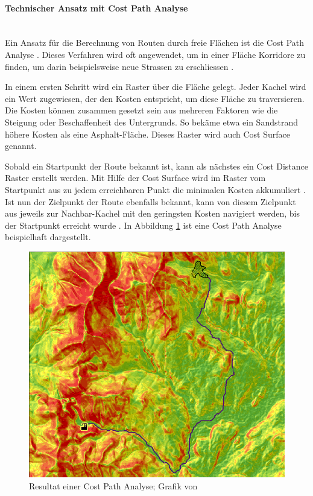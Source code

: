 \paragraph{Technischer Ansatz mit Cost Path Analyse}~\\
Ein Ansatz für die Berechnung von Routen durch freie Flächen ist die Cost Path Analyse \cite{cost_path_analysis}. Dieses Verfahren wird oft angewendet, um in einer Fläche Korridore zu finden, um darin beispielsweise neue Strassen zu erschliessen \cite{gis-wiki:cost-path-analysis}.

In einem ersten Schritt wird ein Raster über die Fläche gelegt. Jeder Kachel wird ein Wert zugewiesen, der den Kosten entspricht, um diese Fläche zu traversieren. Die Kosten können zusammen gesetzt sein aus mehreren Faktoren wie die Steigung oder Beschaffenheit des Untergrunds. So bekäme etwa ein Sandstrand höhere Kosten als eine Asphalt-Fläche. Dieses Raster wird auch Cost Surface genannt. \cite{gid_fundamentals}

Sobald ein Startpunkt der Route bekannt ist, kann als nächstes ein Cost Distance Raster erstellt werden. Mit Hilfe der Cost Surface wird im Raster vom Startpunkt aus zu jedem erreichbaren Punkt die minimalen Kosten akkumuliert \cite{geospatial_analysis}. Ist nun der Zielpunkt der Route ebenfalls bekannt, kann von diesem Zielpunkt aus jeweils zur Nachbar-Kachel mit den geringsten Kosten navigiert werden, bis der Startpunkt erreicht wurde \cite{cost_path_analysis}. In Abbildung \ref{fig:cost_path_analysis} ist eine Cost Path Analyse beispielhaft dargestellt.


\begin{figure}[ht]
    \centering
    \includegraphics[width=0.6\linewidth]{technicalreport/img/cost_path_analysis}
    \caption[Cost Path Analyse]{Resultat einer Cost Path Analyse; Grafik von \cite{geospatial_analysis}}
    \label{fig:cost_path_analysis}
\end{figure}

